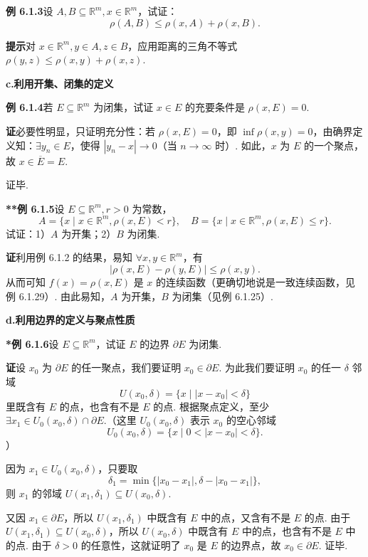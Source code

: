 \documentclass[UTF8,12pt,a4paper,fontset=fandol]{ctexart}
\begin{document}
\noindent\textbf{例 6.1.3}\quad 设 $A,B\subseteq\mathbb{R}^m,x\in\mathbb{R}^m$，试证：
\[
  \rho(A,B)\le \rho(x,A)+\rho(x,B).
\]

\noindent\textbf{提示}\quad 对 $x\in\mathbb{R}^m,y\in A,z\in B$，应用距离的三角不等式 $\rho(y,z)\le \rho(x,y)+\rho(x,z)$.

\noindent\textbf{c.\quad 利用开集、闭集的定义}

\noindent\textbf{例 6.1.4}\quad 若 $E\subseteq\mathbb{R}^m$ 为闭集，试证 $x\in E$ 的充要条件是 $\rho(x,E)=0$.

\noindent\textbf{证}\quad 必要性明显，只证明充分性：若 $\rho(x,E)=0$，即 $\inf\rho(x,y)=0$，由确界定义知：$\exists y_n\in E$，使得 $|y_n-x|\to0$（当 $n\to\infty$ 时）. 如此，$x$ 为 $E$ 的一个聚点，故 $x\in\overline{E}=E$.

证毕.

\noindent\textbf{**例 6.1.5}\quad 设 $E\subseteq\mathbb{R}^m,r>0$ 为常数，
\[
  A=\{x\mid x\in\mathbb{R}^m,\rho(x,E)<r\},\quad
  B=\{x\mid x\in\mathbb{R}^m,\rho(x,E)\le r\}.
\]
试证：1）$A$ 为开集；2）$B$ 为闭集.

\noindent\textbf{证}\quad 利用例 6.1.2 的结果，易知 $\forall x,y\in\mathbb{R}^m$，有
\[
  |\rho(x,E)-\rho(y,E)|\le \rho(x,y).
\]
从而可知 $f(x)=\rho(x,E)$ 是 $x$ 的连续函数（更确切地说是一致连续函数，见例 6.1.29）. 由此易知，$A$ 为开集，$B$ 为闭集（见例 6.1.25）.

\noindent\textbf{d.\quad 利用边界的定义与聚点性质}

\noindent\textbf{*例 6.1.6}\quad 设 $E\subseteq\mathbb{R}^m$，试证 $E$ 的边界 $\partial E$ 为闭集.

\noindent\textbf{证}\quad 设 $x_0$ 为 $\partial E$ 的任一聚点，我们要证明 $x_0\in\partial E$. 为此我们要证明 $x_0$ 的任一 $\delta$ 邻域
\[
  U(x_0,\delta)=\{x\mid |x-x_0|<\delta\}
\]
里既含有 $E$ 的点，也含有不是 $E$ 的点. 根据聚点定义，至少 $\exists x_1\in U_0(x_0,\delta)\cap\partial E$.（这里 $U_0(x_0,\delta)$ 表示 $x_0$ 的空心邻域
\[
  U_0(x_0,\delta)=\{x\mid 0<|x-x_0|<\delta\}.
\]
）

因为 $x_1\in U_0(x_0,\delta)$，只要取
\[
  \delta_1=\min\{|x_0-x_1|,\delta-|x_0-x_1|\},
\]
则 $x_1$ 的邻域 $U(x_1,\delta_1)\subseteq U(x_0,\delta)$.

又因 $x_1\in\partial E$，所以 $U(x_1,\delta_1)$ 中既含有 $E$ 中的点，又含有不是 $E$ 的点. 由于 $U(x_1,\delta_1)\subseteq U(x_0,\delta)$，所以 $U(x_0,\delta)$ 中既含有 $E$ 中的点，也含有不是 $E$ 中的点. 由于 $\delta>0$ 的任意性，这就证明了 $x_0$ 是 $E$ 的边界点，故 $x_0\in\partial E$. 证毕.
\end{document}

